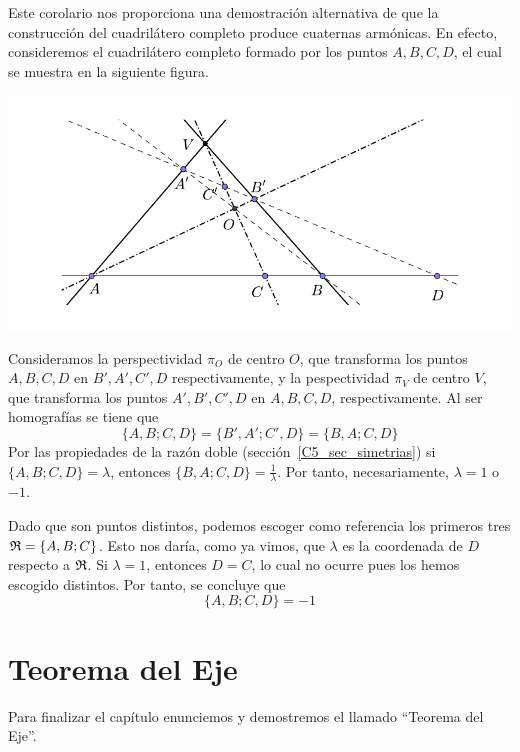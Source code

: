 \begin{obs}
	Este corolario nos proporciona una demostración alternativa de que la construcción del cuadrilátero completo produce cuaternas armónicas. En efecto, consideremos el cuadrilátero completo formado por los puntos $A,B,C,D$, el cual se muestra en la siguiente figura. 
	\begin{center}
		\includegraphics[scale=.9]{Graficos/Desargues/cuadrilatero}
	\end{center}
	Consideramos la perspectividad $\pi_O$ de centro $O$, que transforma los puntos $A,B,C,D$ en $B',A',C',D$ respectivamente, y la pespectividad $\pi_V$ de centro $V$, que transforma los puntos $A',B',C',D$ en $A,B,C,D$, respectivamente. Al ser homografías se tiene que
	\[\{A,B;C,D\}=\{B',A';C',D\}=\{B,A;C,D\}\]
	Por las propiedades de la razón doble (sección~\ref{C5_sec_simetrias}) si $\{A,B;C,D\}=\lambda$, entonces $\{B,A;C,D\}=\frac{1}{\lambda}$. Por tanto, necesariamente, $\lambda=1$ o $-1$.
	
	Dado que son puntos distintos, podemos escoger como referencia los primeros tres $\mathfrak{R}=\{A,B;C\}$. Esto nos daría, como ya vimos, que $\lambda$ es la coordenada de $D$ respecto a $\mathfrak{R}$. Si $\lambda=1$, entonces $D=C$, lo cual no ocurre pues los hemos escogido distintos. Por tanto, se concluye que 
	\[\{A,B;C,D\}=-1\]
\end{obs}
\section{Teorema del Eje}
\label{C7_Eje}
Para finalizar el capítulo enunciemos y demostremos el llamado ``Teorema del Eje''.

